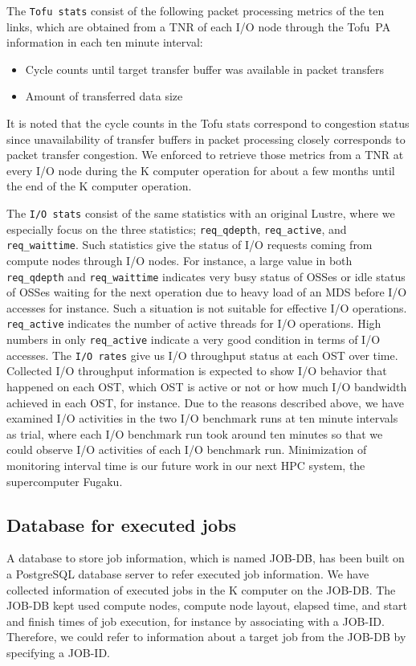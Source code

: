 \documentclass{jhps}
\begin{document}
The {\tt Tofu stats} consist of the following packet processing metrics
of the ten links, which are obtained from a TNR of each I/O node through
the Tofu~PA information in each ten minute interval:
%
\begin{itemize}
\item Cycle counts until target transfer buffer was available in packet transfers
\item Amount of transferred data size
\end{itemize}
%
It is noted that the cycle counts in the Tofu stats correspond to congestion status
since unavailability of transfer buffers in packet processing closely corresponds to
packet transfer congestion.
We enforced to retrieve those metrics from a TNR at every I/O node
during the K computer operation for about a few months
until the end of the K computer operation.

The {\tt I/O stats} consist of the same statistics with an original Lustre,
where we especially focus on the three statistics;
{\tt req\_qdepth}, {\tt req\_active}, and {\tt req\_waittime}.
Such statistics give the status of I/O requests coming from compute nodes through I/O nodes.
For instance, a large value in both {\tt req\_qdepth} and {\tt req\_waittime} indicates
very busy status of OSSes or idle status of OSSes waiting for the next operation
due to heavy load of an MDS before I/O accesses for instance.
Such a situation is not suitable for effective I/O operations.
{\tt req\_active} indicates the number of active threads for I/O operations.
High numbers in only {\tt req\_active} indicate a very good condition
in terms of I/O accesses.
The {\tt I/O rates} give us I/O throughput status at each OST over time.
Collected I/O throughput information is expected to show I/O behavior
that happened on each OST, which OST is active or not or how much I/O bandwidth
achieved in each OST, for instance.
Due to the reasons described above, we have examined I/O activities
in the two I/O benchmark runs at ten minute intervals as trial,
where each I/O benchmark run took around ten minutes
so that we could observe I/O activities of each I/O benchmark run.
Minimization of monitoring interval time is our future work
in our next HPC system, the supercomputer Fugaku.

\subsection{Database for executed jobs}
\label{ssec:JOB_DB}

A database to store job information, which is named JOB-DB,
has been built on a PostgreSQL database server to refer executed job information.
We have collected information of executed jobs in the K computer
on the JOB-DB.
The JOB-DB kept used compute nodes, compute node layout, elapsed time,
and start and finish times of job execution, for instance
by associating with a JOB-ID.
Therefore, we could refer to information about a target job
from the JOB-DB by specifying a JOB-ID.
\end{document}
